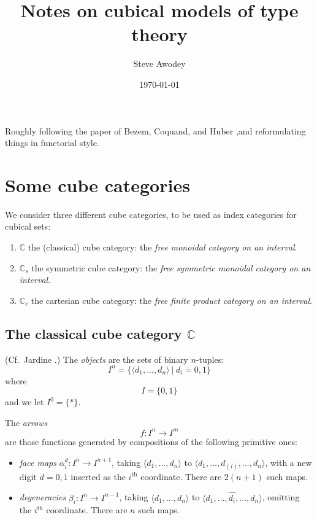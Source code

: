 \documentclass[11pt]{article}
\theoremstyle{remark}
\theoremstyle{definition}
\begin{document}

\title{Notes on cubical models of type theory}
\author{Steve Awodey}
\date{\today}

\maketitle

\noindent
Roughly following the paper of Bezem, Coquand, and Huber \cite{BCH} ,and reformulating things in functorial style.

\section{Some cube categories}

We consider three different cube categories, to be used as index categories for cubical sets:

\begin{enumerate}
\item $\mathbb{C}$ the (classical) cube category: the \emph{free monoidal category on an interval}.
\item $\mathbb{C}_s$ the symmetric cube category: the \emph{free symmetric monoidal category on an interval}.
\item $\mathbb{C}_c$ the cartesian cube category: the \emph{free finite product category on an interval}.
\end{enumerate}

\subsection{The classical cube category $\mathbb{C}$}

(Cf.\ Jardine \cite{Jardine2001,Jardine2002}.)
The \emph{objects} are the sets of binary $n$-tuples:
\[
I^n = \{ \langle d_1, ..., d_n\rangle\ \vert\ d_i = 0,1\}
\]
where 
\[
I = \{ 0, 1\}
\]
and we let $I^0 = \{*\}$.

The \emph{arrows} $$f : I^n \to I^m$$ are those functions generated by compositions of the following primitive ones:
\begin{itemize}
\item \emph{face maps} $\alpha^{d}_{i} : I^n \to I^{n+1}$, taking $\langle d_1, ..., d_n\rangle$ to $\langle d_1, ..., d_{(i)}, ..., d_n\rangle$, with a new digit $d = 0,1$ inserted as the $i^{\mathrm{th}}$ coordinate. There are $2(n+1)$ such maps.

\item \emph{degeneracies} $\beta_{i} : I^n \to I^{n-1}$, taking $\langle d_1, ..., d_n\rangle$ to $\langle d_1, ..., \hat{d_{i}}, ..., d_n\rangle$, omitting the $i^{\mathrm{th}}$ coordinate.  There are $n$ such maps.
\end{itemize}
\end{document}
